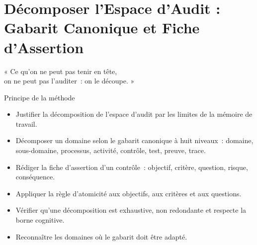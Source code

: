 
\chapter[Décomposer l'Espace d'Audit]{Décomposer l'Espace d'Audit : Gabarit Canonique et Fiche d'Assertion}
\label{chap:decomposition}

\epigraph{%
    « Ce qu'on ne peut pas tenir en tête,\\
    on ne peut pas l'auditer~: on le découpe. »%
}{Principe de la méthode}


\begin{boxobjectifs}
\begin{itemize}
    \item Justifier la décomposition de l'espace d'audit par les limites de
          la mémoire de travail.
    \item Décomposer un domaine selon le gabarit canonique à huit niveaux~:
          domaine, sous-domaine, processus, activité, contrôle, test, preuve,
          trace.
    \item Rédiger la fiche d'assertion d'un contrôle~: objectif, critère,
          question, risque, conséquence.
    \item Appliquer la règle d'atomicité aux objectifs, aux critères et aux
          questions.
    \item Vérifier qu'une décomposition est exhaustive, non redondante et
          respecte la borne cognitive.
    \item Reconnaître les domaines où le gabarit doit être adapté.
\end{itemize}
\end{boxobjectifs}

